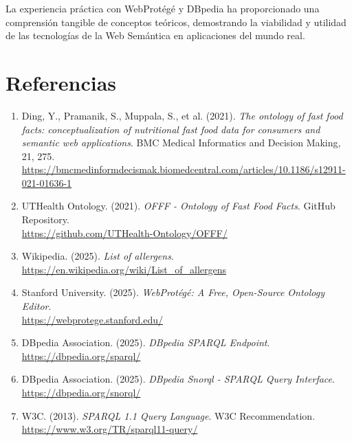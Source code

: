 \documentclass[12pt,a4paper]{article}
\begin{document}
La experiencia práctica con WebProtégé y DBpedia ha proporcionado una comprensión tangible de conceptos teóricos, demostrando la viabilidad y utilidad de las tecnologías de la Web Semántica en aplicaciones del mundo real.

\section{Referencias}

\begin{enumerate}
    \item Ding, Y., Pramanik, S., Muppala, S., et al. (2021). \textit{The ontology of fast food facts: conceptualization of nutritional fast food data for consumers and semantic web applications}. BMC Medical Informatics and Decision Making, 21, 275. \\
    \url{https://bmcmedinformdecismak.biomedcentral.com/articles/10.1186/s12911-021-01636-1}
    
    \item UTHealth Ontology. (2021). \textit{OFFF - Ontology of Fast Food Facts}. GitHub Repository. \\
    \url{https://github.com/UTHealth-Ontology/OFFF/}
    
    \item Wikipedia. (2025). \textit{List of allergens}. \\
    \url{https://en.wikipedia.org/wiki/List_of_allergens}
    
    \item Stanford University. (2025). \textit{WebProtégé: A Free, Open-Source Ontology Editor}. \\
    \url{https://webprotege.stanford.edu/}
    
    \item DBpedia Association. (2025). \textit{DBpedia SPARQL Endpoint}. \\
    \url{https://dbpedia.org/sparql/}
    
    \item DBpedia Association. (2025). \textit{DBpedia Snorql - SPARQL Query Interface}. \\
    \url{https://dbpedia.org/snorql/}
    
    \item W3C. (2013). \textit{SPARQL 1.1 Query Language}. W3C Recommendation. \\
    \url{https://www.w3.org/TR/sparql11-query/}
    

\end{enumerate}
\end{document}
